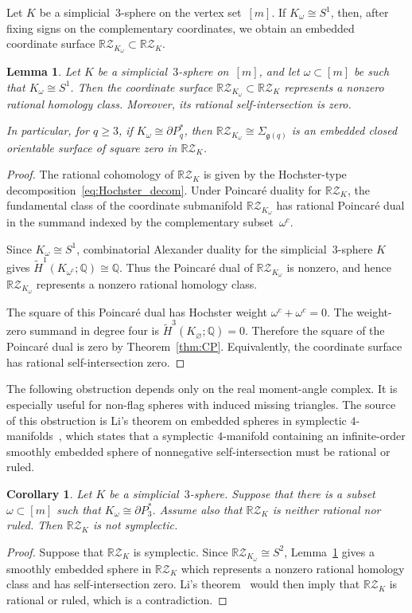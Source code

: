 \documentclass{amsart}
\newtheorem{lemma}[theorem]{Lemma}
\newtheorem{corollary}[theorem]{Corollary}
\numberwithin{equation}{section}
\theoremstyle{definition}
\theoremstyle{remark}
\newcommand{\Q}{\mathbb Q}
\newcommand{\RZ}{\mathbb R\mathcal Z}
\def\genus{\mathfrak g}
\begin{document}
Let $K$ be a simplicial~$3$-sphere on the vertex set~$[m]$.
If $K_\omega\cong S^1$, then, after fixing signs on the complementary coordinates, we obtain an embedded coordinate surface $\RZ_{K_\omega} \subset \RZ_K$.

\begin{lemma}\label{lem:coordinate-surface-dual}
    Let $K$ be a simplicial~$3$-sphere on~$[m]$, and let $\omega\subset [m]$ be such that $K_\omega\cong S^1$.
    Then the coordinate surface $\RZ_{K_\omega}\subset \RZ_K$ represents a nonzero rational homology class. 
    Moreover, its rational self-intersection is zero.
    
    In particular, for $q \geq 3$, if $K_\omega\cong \partial P_q^\ast$, then $\RZ_{K_\omega}\cong \Sigma_{\genus(q)}$ is an embedded closed orientable surface of square zero in $\RZ_K$.
\end{lemma}
\begin{proof}
    The rational cohomology of $\RZ_K$ is given by the Hochster-type decomposition~\eqref{eq:Hochster_decom}.
    Under Poincar\'e duality for $\RZ_K$, the fundamental class of the coordinate submanifold $\RZ_{K_\omega}$ has rational Poincar\'e dual in the summand indexed by the complementary subset~$\omega^c$.
    
    Since $K_\omega\cong S^1$, combinatorial Alexander duality for the simplicial~$3$-sphere $K$ gives $\widetilde H^1(K_{\omega^c};\Q)\cong \Q$.
    Thus the Poincar\'e dual of $\RZ_{K_\omega}$ is nonzero, and hence $\RZ_{K_\omega}$ represents a nonzero rational homology class.
    
    The square of this Poincar\'e dual has Hochster weight $\omega^c+\omega^c=0$.
    The weight-zero summand in degree four is $\widetilde H^3(K_\varnothing;\Q)=0$.
    Therefore the square of the Poincar\'e dual is zero by Theorem~\ref{thm:CP}. 
    Equivalently, the coordinate surface has rational self-intersection zero.
\end{proof}

The following obstruction depends only on the real moment-angle complex.
It is especially useful for non-flag spheres with induced missing triangles.
The source of this obstruction is Li's theorem on embedded spheres in symplectic $4$-manifolds~\cite{Li1999}, which states that a symplectic $4$-manifold containing an infinite-order smoothly embedded sphere of nonnegative self-intersection must be rational or ruled.

\begin{corollary}\label{cor:coordinate-sphere-obstruction}
Let $K$ be a simplicial~$3$-sphere. 
Suppose that there is a subset $\omega\subset [m]$ such that $K_\omega\cong \partial P^\ast_3$.
Assume also that $\RZ_K$ is neither rational nor ruled. 
Then $\RZ_K$ is not symplectic.
\end{corollary}
\begin{proof}
    Suppose that $\RZ_K$ is symplectic.
    Since $\RZ_{K_\omega}\cong S^2$, Lemma~\ref{lem:coordinate-surface-dual} gives a smoothly embedded sphere in $\RZ_K$ which represents a nonzero rational homology class and has self-intersection zero.
    Li's theorem~\cite{Li1999} would then imply that $\RZ_K$ is rational or ruled, which is a contradiction.
\end{proof}
\end{document}
